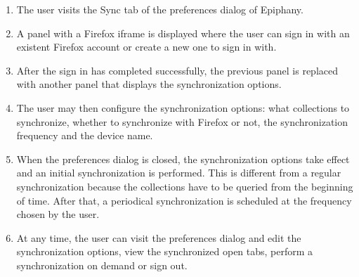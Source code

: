 \begin{enumerate}
  \item The user visits the Sync tab of the preferences dialog of Epiphany.

  \item A panel with a Firefox iframe is displayed where the user can sign in with an existent Firefox account or create a new one to sign in with.

  \item After the sign in has completed successfully, the previous panel is replaced with another panel that displays the synchronization options.

  \item The user may then configure the synchronization options: what collections to synchronize, whether to synchronize with Firefox or not, the synchronization frequency and the device name.

  \item When the preferences dialog is closed, the synchronization options take effect and an initial synchronization is performed. This is different from a regular synchronization because the collections have to be queried from the beginning of time. After that, a periodical synchronization is scheduled at the frequency chosen by the user.

  \item At any time, the user can visit the preferences dialog and edit the synchronization options, view the synchronized open tabs, perform a synchronization on demand or sign out.
\end{enumerate}
